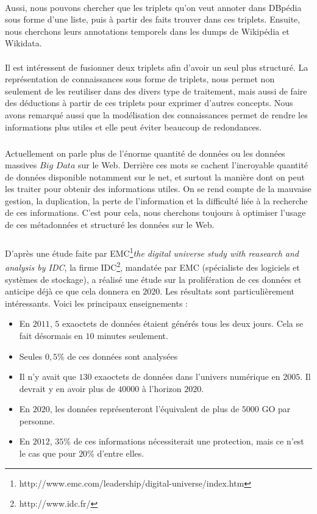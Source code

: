 \documentclass[12pt,a4	]{report}
\begin{document}
\paragraph{}
Aussi, nous pouvons chercher que les triplets qu'on veut annoter dans DBpédia sous forme d'une liste, puis à partir des faits trouver dans ces triplets. Ensuite, nous cherchons leurs annotations temporels dans les dumps de Wikipédia et Wikidata.
\paragraph{}
Il est intéressent de fusionner deux triplets afin d'avoir un seul plus structuré. La représentation de connaissances sous forme de triplets, nous permet non seulement de les reutiliser dans des divers type de traitement, mais aussi de faire des déductions à partir de ces triplets pour exprimer d'autres concepts. Nous avons remarqué aussi que la modélisation des connaissances permet de rendre les informations plus utiles et elle peut éviter beaucoup de redondances. 
\subparagraph{}
Actuellement on parle plus de l'énorme quantité de données ou les données massives $Big$ $Data$ sur le Web. Derrière ces mots se cachent l’incroyable quantité de données disponible notamment sur le net, et surtout la manière dont on peut les traiter pour obtenir des informations utiles. On se rend compte de la mauvaise gestion, la duplication, la perte de l'information et la difficulté liée à la recherche de ces informations. C'est pour cela, nous cherchons toujours à optimiser l'usage de ces métadonnées et structuré les données sur le Web.
\subparagraph{}
D'après une étude faite par EMC\footnote{http://www.emc.com/leadership/digital-universe/index.htm}{\it the digital universe study with  reasearch and analysis by IDC}, la firme IDC\footnote{http://www.idc.fr/}, mandatée par EMC (spécialiste des logiciels et systèmes de stockage), a réalisé une étude sur la prolifération de ces données et anticipe déjà ce que cela donnera en $2020$. Les résultats sont particulièrement intéressants. Voici les principaux enseignements :
\begin{itemize}
\item En $2011$, $5$ exaoctets de données étaient générés tous les deux jours. Cela se fait désormais en $10$ minutes seulement.
\item Seules $0,5$\% de ces données sont analysées
\item Il n’y avait que $130$ exaoctets de données dans l’univers numérique en $2005$. Il devrait y en avoir plus de $40 000$ à l’horizon $2020$.
\item En $2020$, les données représenteront l’équivalent de plus de $5 000$ GO par personne.
\item En $2012$, $35$\% de ces informations nécessiterait une protection, mais ce n’est le cas que pour $20$\% d’entre elles.
\end{itemize}
\end{document}
